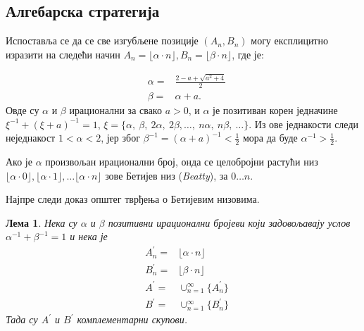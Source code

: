 \documentclass[a4paper]{article}
\newtheorem{lemma}{Лема}
\begin{document}
\subsection{Алгебарска стратегија}

Испоставља се да се све изгубљене позиције $ (A_{n}, B_{n}) $ могу експлицитно изразити на следећи начин $ A_{n} = \lfloor \alpha \cdot n \rfloor, B_{n} = \lfloor \beta \cdot n \rfloor $, где је:

\begin{eqnarray}
	&\alpha = &\frac{2 - a + \sqrt{a^2 + 4}}{2} \label{def:alpha}\\  
	&\beta = &\alpha + a \label{def:beta}.
\end{eqnarray}
Овде су $ \alpha $ и $ \beta $ ирационални за свако $ a > 0 $, и $ \alpha $ је позитиван корен једначине $ \xi^{-1} + (\xi + a)^{-1} = 1 $, $ \xi = \{\alpha,\ \beta,\ 2\alpha,\ 2\beta,\ldots,\ n\alpha,\ n\beta,\ \ldots\} $. Из ове једнакости следи неједнакост
$ 1<\alpha<2 $, јер због $ \beta^{-1} = (\alpha+a)^{-1} < \frac{1}{2 }$ мора да буде $ \alpha^{-1} > \frac{1}{2} $.

Ако је $ \alpha $ произвољан ирационални број, онда се целобројни растући низ $ \lfloor \alpha \cdot 0 \rfloor, \lfloor \alpha \cdot 1 \rfloor, \ldots \lfloor \alpha \cdot n \rfloor $ зове Бетијев низ (\textit{{Beatty}}), за $ 0 \ldots n $.

Најпре следи доказ општег тврђења о Бетијевим низовима.

\begin{lemma}
	\label{lemma:alg_komplementarnost}
	Нека су $ \alpha $ и $ \beta $ позитивни ирационални бројеви који задовољавају услов $ \alpha^{-1} + \beta^{-1} = 1 $ и нека је 
	\begin{eqnarray*} 
		&A^{'}_{n}= &\lfloor \alpha \cdot n \rfloor\\
		&B^{'}_{n} = &\lfloor \beta \cdot n \rfloor\\
		&A^{'} = &\cup_{n=1}^{\infty}\{A^{'}_{n}\}\\
		&B^{'} = &\cup_{n=1}^{\infty}\{B^{'}_{n}\}
	\end{eqnarray*}
	Тада су $ A^{'} $ и $ B^{'} $ комплементарни скупови.
\end{lemma}
\end{document}
